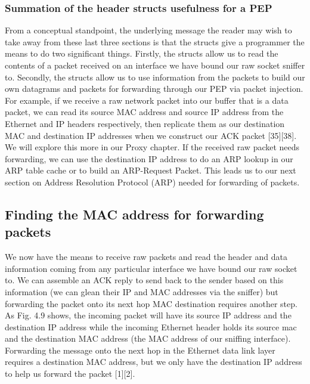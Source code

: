 \documentclass{uathesis}
\begin{document}
\subsubsection{Summation of the header structs usefulness for a PEP}
From a conceptual standpoint, the underlying message the reader may wish to take away from these last three sections is that the structs give a programmer the means to do two significant things. Firstly, the structs allow us to read the contents of a packet received on an interface we have bound our raw socket sniffer to. Secondly, the structs allow us to use information from the packets to build our own datagrams and packets for forwarding through our PEP via packet injection. For example, if we receive a raw network packet into our buffer that is a data packet, we can read its source MAC address and source IP address from the Ethernet and IP headers respectively, then replicate them as our destination MAC and destination IP addresses when we construct our ACK packet [35][38]. We will explore this more in our Proxy chapter. If the received raw packet needs forwarding, we can use the destination IP address to do an ARP lookup in our ARP table cache or to build an ARP-Request Packet. This leads us to our next section on Address Resolution Protocol (ARP) needed for forwarding of packets. \\

\subsection{Finding the MAC address for forwarding packets}
We now have the means to receive raw packets and read the header and data information coming from any particular interface we have bound our raw socket to. We can assemble an ACK reply to send back to the sender based on this information (we can glean their IP and MAC addresses via the sniffer) but forwarding the packet onto its next hop MAC destination requires another step. \\

As Fig. 4.9 shows, the incoming packet will have its source IP address and the destination IP address while the incoming Ethernet header holds its source mac and the destination MAC address (the MAC address of our sniffing interface). Forwarding the message onto the next hop in the Ethernet data link layer requires a destination MAC address, but we only have the destination IP address to help us forward the packet [1][2].\\
\end{document}
